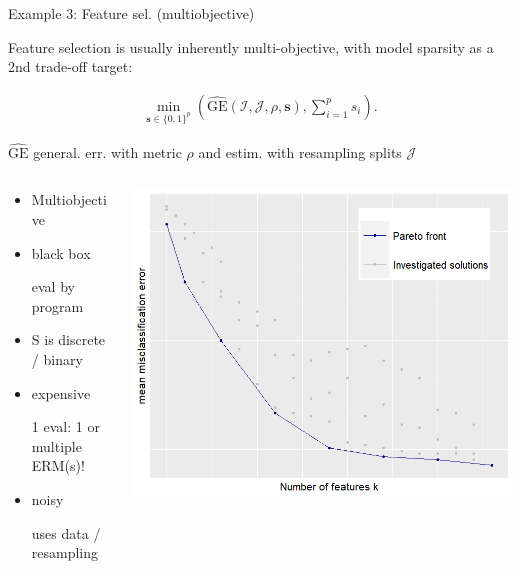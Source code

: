 \documentclass[11pt,compress,t,notes=noshow, xcolor=table]{beamer}
\begin{document}
\begin{vbframe}{Example 3: Feature sel. (multiobjective)}

Feature selection is usually inherently multi-objective,
with model sparsity as a 2nd trade-off target:

  \begin{eqnarray*}
    \min_{\textbf{s} \in \{0, 1\}^p} \left(\widehat{\text{GE}}(\mathcal{I}, \mathcal{J}, \rho, \bm{s}), \sum\nolimits_{i = 1}^p s_i\right). 
\end{eqnarray*}

$\widehat{\text{GE}}$ general. err. with metric $\rho$ and estim. with resampling splits $\mathcal{J}$ 


\begin{columns}
\begin{column}{0.4\textwidth}
\begin{itemize}
\item Multiobjective
\item black box \\
\begin{footnotesize}eval by program\end{footnotesize}
\item S is discrete / binary
\item expensive \\
\begin{footnotesize}
1 eval: 1 or multiple ERM(s)!
\end{footnotesize}
\item noisy \\
\begin{footnotesize}
uses data / resampling
\end{footnotesize}
\end{itemize}
\end{column}
\begin{column}{0.5\textwidth}
\begin{center}
\includegraphics{figure_man/pareto.png}
\end{center}
\end{column}
\end{columns}

\end{vbframe}
\end{document}
